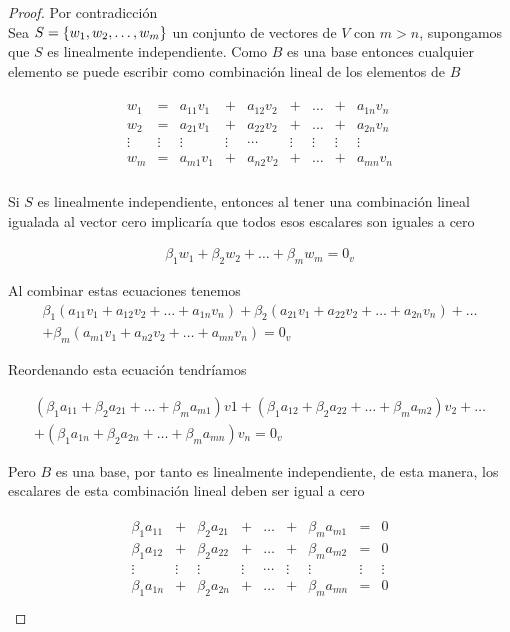 \begin{proof}
Por contradicción ~\\
Sea $S= \lbrace w_1, w_2, \ldots, w_m \rbrace$ un conjunto de vectores de $V$ con $m>n$, supongamos que $S$ es linealmente independiente. Como $B$ es una base entonces cualquier elemento se puede escribir como combinación lineal de los elementos de $B$

\begin{align*}
    \begin{array}{ccccccccc}
        w_1 &=& a_{11} v_1&+&a_{12} v_2 &+&\ldots &+&a_{1n} v_n\\
        w_2&=&a_{21} v_1&+&a_{22} v_2 &+&\ldots &+&a_{2n} v_n\\
        \vdots&\vdots&\vdots&\vdots&\cdots&\vdots&\vdots&\vdots&\vdots\\
        w_m&=&a_{m1} v_1&+&a_{n2} v_2 &+&\ldots &+&a_{mn} v_n\\
    \end{array}
\end{align*}

Si $S$ es linealmente independiente, entonces al tener una combinación lineal igualada al vector cero implicaría que todos esos escalares son iguales a cero

\begin{eqnarray*}
\beta_1 w_1+\beta_2 w_2 +\ldots +\beta_m w_m=0_v
\end{eqnarray*}

Al combinar estas ecuaciones tenemos
\begin{eqnarray*}
\beta_1 (a_{11} v_1+a_{12} v_2 +\ldots +a_{1n} v_n)+
\beta_2 (a_{21} v_1+a_{22} v_2 +\ldots +a_{2n} v_n) +\ldots \\+
\beta_m (a_{m1} v_1+a_{n2} v_2 +\ldots +a_{mn} v_n)
=0_v
\end{eqnarray*}

Reordenando esta ecuación tendríamos


\begin{eqnarray*}
(\beta_1 a_{11}+\beta_2 a_{21}+\ldots+\beta_m a_{m1})v1+
(\beta_1 a_{12}+\beta_2 a_{22}+\ldots+\beta_m a_{m2})v_2+
\ldots\\+
(\beta_1 a_{1n}+\beta_2 a_{2n}+\ldots+\beta_m a_{mn})v_n=0_v
\end{eqnarray*}

Pero $B$ es una base, por tanto es linealmente independiente, de esta manera, los escalares de esta combinación lineal deben ser igual a cero

\begin{align*}
\begin{array}{ccccccccc}
\beta_1 a_{11}&+&\beta_2 a_{21}&+&\ldots&+&\beta_m a_{m1}&=&0\\
\beta_1 a_{12}&+&\beta_2 a_{22}&+&\ldots&+&\beta_m a_{m2}&=&0\\
\vdots&\vdots&\vdots&\vdots&\cdots&\vdots&\vdots&\vdots&\vdots\\
\beta_1 a_{1n}&+&\beta_2 a_{2n}&+&\ldots&+&\beta_m a_{mn}&=&0\\
\end{array}
\end{align*}



\end{proof}
